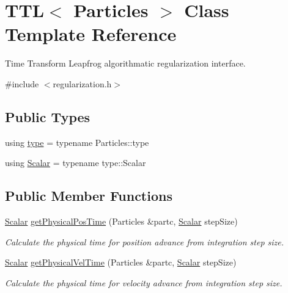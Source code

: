 \hypertarget{class_t_t_l}{}\section{T\+TL$<$ Particles $>$ Class Template Reference}
\label{class_t_t_l}


Time Transform Leapfrog algorithmatic regularization interface.  




{\ttfamily \#include $<$regularization.\+h$>$}

\subsection*{Public Types}
\begin{DoxyCompactItemize}
\item 
using \mbox{\hyperlink{class_t_t_l_af4afef1cacfe12873d9d97ca04d66d11}{type}} = typename Particles\+::type
\item 
using \mbox{\hyperlink{class_t_t_l_a8d541e387362cebeb59841d22d78f2b4}{Scalar}} = typename type\+::\+Scalar
\end{DoxyCompactItemize}
\subsection*{Public Member Functions}
\begin{DoxyCompactItemize}
\item 
\mbox{\hyperlink{class_t_t_l_a8d541e387362cebeb59841d22d78f2b4}{Scalar}} \mbox{\hyperlink{class_t_t_l_a0b0f528b376e0ddffef5e7847562ac37}{get\+Physical\+Pos\+Time}} (Particles \&partc, \mbox{\hyperlink{class_t_t_l_a8d541e387362cebeb59841d22d78f2b4}{Scalar}} step\+Size)
\begin{DoxyCompactList}\small\item\em Calculate the physical time for position advance from integration step size. \end{DoxyCompactList}\item 
\mbox{\hyperlink{class_t_t_l_a8d541e387362cebeb59841d22d78f2b4}{Scalar}} \mbox{\hyperlink{class_t_t_l_a84a267b2836e5bf4f98a04bed6b6dccb}{get\+Physical\+Vel\+Time}} (Particles \&partc, \mbox{\hyperlink{class_t_t_l_a8d541e387362cebeb59841d22d78f2b4}{Scalar}} step\+Size)
\begin{DoxyCompactList}\small\item\em Calculate the physical time for velocity advance from integration step size. \end{DoxyCompactList}\end{DoxyCompactItemize}


